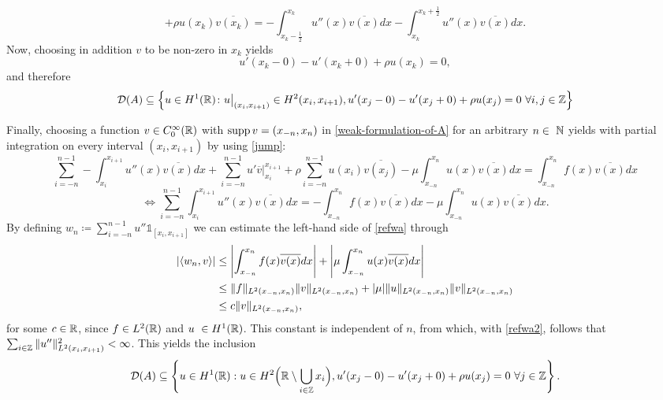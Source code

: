 	\[ +  \rho u(x_{k})\overline{v(x_{k})} = - \int_{x_{k} - \frac{1}{2}}^{x_{k}} u''(x) \overline{v(x)} dx - \int_{x_{k}}^{x_{k} + \frac{1}{2}} u''(x) \overline{v(x)} dx. \]
Now, choosing in addition $v$ to be non-zero in $x_{k}$ yields 
	\begin{equation}
		u'(x_{k}-0) - u'(x_{k}+0) + \rho u(x_{k}) = 0, \label{jump}
	\end{equation} 
and therefore
	\begin{equation}
		\mathcal{D}(A) \subseteq \Big\{ u \in H^{1}(\mathbb{R}) \colon u\big|_{(x_{i}, x_{i+1})} \in H^{2}(x_{i}, x_{i+1}), u'(x_{j} - 0) - u'(x_{j} + 0) + \rho u(x_{j}) = 0 ~\forall i, j \in \mathbb{Z} \Big\}
	\end{equation} 
	
Finally, choosing a function $v \in C_{0}^{\infty}(\mathbb{R})$ with $\operatorname{supp} v = (x_{-n}, x_{n})$ in \eqref{weak-formulation-of-A} for an arbitrary $n \in \N$ yields with partial integration on every interval $(x_{i}, x_{i+1})$ by using \eqref{jump}:
\[ \sum_{i=-n}^{n-1} -\int_{x_{i}}^{x_{i+1}} u''(x) \overline{v(x)} dx + \sum_{i=-n}^{n-1} u' \overline{v} \big|_{x_{i}}^{x_{i+1}} + \rho \sum_{i=-n}^{n-1} u(x_{i}) \overline{v(x_{j})} - \mu \int_{x_{-n}}^{x_{n}} u(x) \overline{v(x)} dx = \int_{x_{-n}}^{x_{n}} f(x) \overline{v(x)} dx \]
\begin{equation}
	\iff \sum_{i=-n}^{n-1} \int_{x_{i}}^{x_{i+1}} u''(x) \overline{v(x)} dx = - \int_{x_{-n}}^{x_{n}} f(x) \overline{v(x)} dx - \mu \int_{x_{-n}}^{x_{n}} u(x) \overline{v(x)} dx. \label{refwa}
\end{equation} 
By defining $w_{n} \coloneqq \sum_{i=-n}^{n-1} u'' \mathds{1}_{[x_{i}, x_{i+1}]}$ we can estimate the left-hand side of \eqref{refwa} through
\begin{align}
	\left| \langle w_{n}, v \rangle \right| & \leq \left| \int_{x_{-n}}^{x_{n}} f(x) \overline{v(x)} dx \right| + \left| \mu \int_{x_{-n}}^{x_{n}} u(x) \overline{v(x)} dx \right|  \notag \\
		& \leq \|f\|_{L^{2}(x_{-n}, x_{n})} \|v\|_{L^{2}(x_{-n}, x_{n})} + |\mu| \|u\|_{L^{2}(x_{-n}, x_{n})} \|v\|_{L^{2}(x_{-n}, x_{n})} \notag \\
		& \leq c \|v\|_{L^{2}(x_{-n}, x_{n})}, \label{refwa2}
\end{align}
for some $c \in \mathbb{R}$, since $f \in L^{2}(\mathbb{R})$ and $u \in H^{1}(\R)$. This constant is independent of $n$, from which, with \eqref{refwa2}, follows that $\sum_{i \in \mathbb{Z}} \|u''\|^{2}_{L^{2}(x_{i}, x_{i+1})} < \infty$. This yields the inclusion
	\begin{equation}
		\mathcal{D}(A) \subseteq \left\{ u \in H^{1}(\mathbb{R}): u \in H^{2}\Big(\mathbb{R} \setminus \bigcup_{i \in \mathbb{Z}} x_{i} \Big), u'(x_{j} - 0) - u'(x_{j} + 0) + \rho u(x_{j}) = 0 ~\forall j \in \mathbb{Z} \right\}. \label{firstdomaininclusion} 
	\end{equation}
